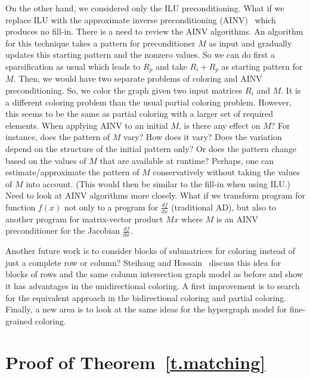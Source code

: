 \documentclass[11pt, twoside,a4paper]{book}
\begin{document}
On the other hand, we considered only the ILU preconditioning. What if we replace ILU with the approximate inverse preconditioning (AINV)~\cite{ainv98} which produces no fill-in. There is a need to review the AINV algorithms. An algorithm for this technique takes a pattern for preconditioner $M$ as input and gradually updates this starting pattern and the nonzero values.
So we can do first a sparsification as usual which leads to $R_p$ and take $R_i + R_p$ as starting pattern for $M$. Then, we would have two separate problems of coloring and AINV preconditioning. 
So, we color the graph given two input matrices $R_i$ and $M$.
It is a different coloring problem than the usual partial coloring problem. 
However, this seems to be the same as partial coloring with a larger set of required elements.
When applying AINV to an initial $M$, is there any effect on $M$? For
instance, does the pattern of $M$ vary? How does it vary? Does the
variation depend on the structure of the initial pattern only? Or
does the pattern change based on the values of $M$ that are available
at runtime? Perhaps, one can estimate/approximate the pattern of $M$
conservatively without taking the values of $M$ into account. (This
would then be similar to the fill-in when using ILU.) Need to look
at AINV algorithms more closely.
What if we transform program for function $f(x)$ not only to a program for $\frac{df}{dx}$ (traditional AD), but also to another program for matrix-vector product $Mx$ where $M$ is an AINV preconditioner for the Jacobian $\frac{df}{dx}$.

Another future work is to consider blocks of submatrices for coloring instead of just a complete row or column? Steihaug and Hossain~\cite{Steihaug1997GCa} discuss this idea for blocks of rows and the same column intersection graph model as before and show it has advantages in the unidirectional coloring. A first improvement is to search for the equivalent approach in the bidirectional coloring and partial coloring. Finally, a new area is to look at the same ideas for the hypergraph model for fine-grained coloring.



\appendix
\chapter{Proof of Theorem~\ref{t.matching}}
\label{app.proof.1}
\end{document}
